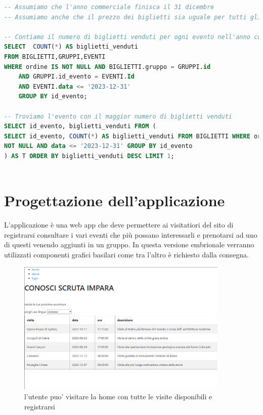 \documentclass[a4paper,12pt]{report}
\begin{document}
\begin{lstlisting}[style=codeStyle,language=SQL,caption={operazione \textbf{Evento che ha venduto di piu' a fini statistici } \ref{op:Vendite_annuali}}]
-- Assumiamo che l'anno commerciale finisca il 31 dicembre
-- Assumiamo anche che il prezzo dei biglietti sia uguale per tutti gli eventi

-- Contiamo il numero di biglietti venduti per ogni evento nell'anno commerciale
SELECT  COUNT(*) AS biglietti_venduti 
FROM BIGLIETTI,GRUPPI,EVENTI 
WHERE ordine IS NOT NULL AND BIGLIETTI.gruppo = GRUPPI.id 
	AND GRUPPI.id_evento = EVENTI.Id 
    AND EVENTI.data <= '2023-12-31' 
    GROUP BY id_evento;

-- Troviamo l'evento con il maggior numero di biglietti venduti
SELECT id_evento, biglietti_venduti FROM (
SELECT id_evento, COUNT(*) AS biglietti_venduti FROM BIGLIETTI WHERE ordine IS
NOT NULL AND data <= '2023-12-31' GROUP BY id_evento
) AS T ORDER BY biglietti_venduti DESC LIMIT 1;
	
\end{lstlisting}
\chapter{Progettazione dell'applicazione}
L'applicazione è una web app che deve permettere ai visitatiori
del sito di registrarsi consultare i vari eventi che più
possano interessarli e prenotarsi ad uno di questi venendo aggiunti
in un gruppo.
In questa versione embrionale verranno utilizzati componenti grafici basilari
come tra l'altro è richiesto dalla consegna.

\begin{figure}[H]
	\centering
	\includegraphics[width=0.9\textwidth]{../resources/img/home.png}
	\caption{l'utente puo' visitare la home con tutte le visite disponibili e registrarsi}
	\label{fig:homePage}
\end{figure}
\end{document}
